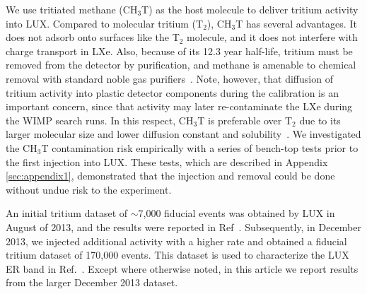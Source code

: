 We use tritiated methane (CH$_3$T) as the host molecule to deliver tritium activity into LUX. Compared to molecular tritium (T$_2$), CH$_3$T has several advantages. It does not adsorb onto surfaces like the T$_2$ molecule, and it does not interfere with charge transport in LXe. Also, because of its 12.3 year half-life, tritium must be removed from the detector by purification, and methane is amenable to chemical removal with standard noble gas purifiers~\cite{Dobi_CH4}. Note, however, that diffusion of tritium activity into plastic detector components during the calibration is an important concern, since that activity may later re-contaminate the LXe during the WIMP search runs.  In this respect, CH$_3$T is preferable over T$_2$ due to its larger molecular size and lower diffusion constant and solubility~\cite{miyake:1983}. We investigated the CH$_3$T contamination risk empirically with a series of bench-top tests prior to the first injection into LUX. These tests, which are described in Appendix \ref{sec:appendix1}, demonstrated that the injection and removal could be done without undue risk to the experiment. 

An initial tritium dataset of $\sim$7,000 fiducial events was obtained by LUX in August of 2013, and the results were reported in Ref~\cite{lux-prl}. Subsequently, in December 2013, we injected additional activity with a higher rate and obtained a fiducial tritium dataset of 170,000 events. This dataset is used to characterize the LUX ER band in Ref.~\cite{lux-reanalysis}. Except where otherwise noted, in this article we report results from the larger December 2013 dataset.